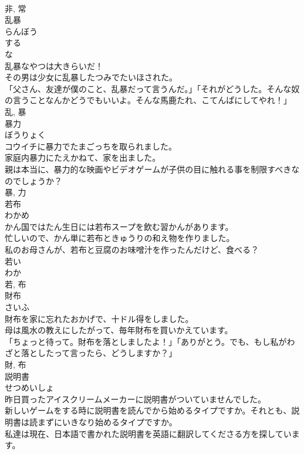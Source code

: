 \documentclass[8pt]{extreport}
\begin{document}
\begin{CJK}{UTF8}{min}
\\	非, 常	
\\	乱暴	
\\	らんぼう	
\\	する 
\\	な 
\\	乱暴なやつは大きらいだ！	
\\	その男は少女に乱暴したつみでたいほされた。	
\\	「父さん、友達が僕のこと、乱暴だって言うんだ。」「それがどうした。そんな奴の言うことなんかどうでもいいよ。そんな馬鹿たれ、こてんぱにしてやれ！」	
\\	乱, 暴	
\\	暴力	
\\	ぼうりょく	
\\	コウイチに暴力でたまごっちを取られました。	
\\	家庭内暴力にたえかねて、家を出ました。	
\\	親は本当に、暴力的な映画やビデオゲームが子供の目に触れる事を制限すべきなのでしょうか？	
\\	暴, 力	
\\	若布	
\\	わかめ	
\\	かん国ではたん生日には若布スープを飲む習かんがあります。	
\\	忙しいので、かん単に若布ときゅうりの和え物を作りました。	
\\	私のお母さんが、若布と豆腐のお味噌汁を作ったんだけど、食べる？	
\\	若い 
\\	わか 
\\	若, 布	
\\	財布	
\\	さいふ	
\\	財布を家に忘れたおかげで、十ドル得をしました。	
\\	母は風水の教えにしたがって、毎年財布を買いかえています。	
\\	「ちょっと待って。財布を落としましたよ！」「ありがとう。でも、もし私がわざと落としたって言ったら、どうしますか？」	
\\	財, 布	
\\	説明書	
\\	せつめいしょ	
\\	昨日買ったアイスクリームメーカーに説明書がついていませんでした。	
\\	新しいゲームをする時に説明書を読んでから始めるタイプですか。それとも、説明書は読まずにいきなり始めるタイプですか。	
\\	私達は現在、日本語で書かれた説明書を英語に翻訳してくださる方を探しています。	

\end{CJK}
\end{document}
